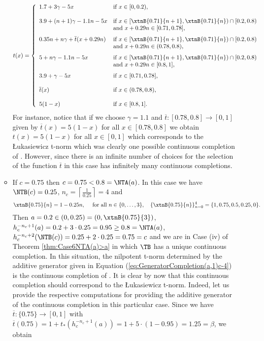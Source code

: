 \begin{example}
\begin{itemize}
\begin{itemize}
			\begin{equation}\label{eq:ExapleGenGen(iii)}
				t(x)
				=
				\left\{ \begin{array}{ll}
					1.7+ 3\gamma - 5x & \text{if } x \in [0,0.2), \\
					& \\
					3.9+(n+1)\gamma-1.1n -5x & \text{if } x \in [\xtnB{0.71}{n+1},\xtnB{0.71}{n}) \cap [0.2,0.8)\\
					& \text{and } x+0.29n \in [0.71,0.78], \\[7pt]
					0.35n +n\gamma + \overline{t}(x+0.29n) & \text{if } x \in [\xtnB{0.71}{n+1},\xtnB{0.71}{n}) \cap [0.2,0.8)\\
					& \text{and } x+0.29n \in (0.78,0.8), \\[7pt]
					5+n\gamma-1.1n-5x & \text{if } x \in [\xtnB{0.71}{n+1},\xtnB{0.71}{n}) \cap [0.2,0.8)\\
					& \text{and } x+0.29n \in [0.8,1], \\[7pt]
					3.9 + \gamma -5x & \text{if } x \in [0.71,0.78], \\
					&\\
					\overline{t}(x) & \text{if } x \in (0.78,0.8), \\
					& \\
					5(1-x) & \text{if } x \in [0.8,1].
				\end{array} \right.
			\end{equation}
			\newpage
			For instance, notice that if we choose $\gamma=1.1$ and $\overline{t}:[0.78,0.8] \to [0,1]$ given by $\overline{t}(x)=5(1-x)$ for all  $x \in [0.78,0.8]$ we obtain $t(x)=5(1-x)$ for all $x \in [0,1]$ which corresponds to the Łukasiewicz t-norm which was clearly one possible continuous completion of \TB. However, since there is an infinite number of choices for the selection of the function $\overline{t}$ in this case \TB has infinitely many continuous completions.
			\item If $c=0.75$ then $c=0.75 < 0.8 = \NTA(a)$.  In this case we have $\NTB(c)=0.25$, $n_c = \left \lceil{\frac{1}{0.25}}\right \rceil = 4$ and
			$$\xtnB{0.75}{n}=1-0.25n, \quad \text{ for all } n \in \{0,\dots,3\}, \quad
			\{\xtnB{0.75}{n}\}_{n=0}^4 = \{1,0.75,0.5,0.25,0\}.$$
			Then  $a=0.2 \in (0,0.25) = (0,\xtnB{0.75}{3})$,
			$h_c^{-n_c+1}(a)=0.2+3\cdot 0.25 =0.95 \geq 0.8 = \NTA(a)$, $h_c^{-n_c+2}(\NTB(c))=0.25+2\cdot 0.25 =0.75=c$ and we are in Case (iv) of Theorem \ref{thm:Case6NTA(a)>a} in which $\TB$ has a unique continuous completion. In this situation, the nilpotent t-norm determined by the additive generator given in Equation (\ref{eq:GeneratorCompletion(a,1)c-4}) is the continuous completion of \TB.  It is clear by now that this continuous completion should correspond to the Łukasiewicz t-norm. Indeed, let us provide the respective computations for providing the additive generator of the continuous completion in this particular case. Since we have $\overline{t}:\{0.75\} \to [0,1]$ with $\overline{t}(0.75)=1+t_*(h_c^{-n_c+1}(a)) = 1+5\cdot(1-0.95)=1.25=\beta$, we obtain

\end{itemize}
\end{itemize}
\end{example}
